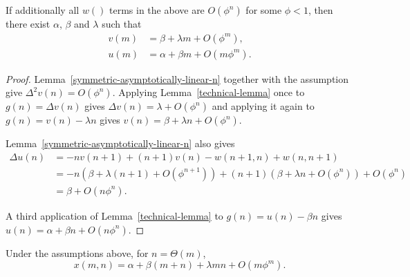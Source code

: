 \documentclass{article}
\begin{document}
\begin{lemma}
  \label{asymptotically-linear-m}
  If additionally all $w()$ terms in the above are $O(\phi^n)$
  for some $\phi < 1$, then there exist 
  $\alpha$, $\beta$ and $\lambda$ such that
  \[
  \begin{split}
    v(m) &= \beta + \lambda m + O(\phi^m), \\
    u(m) &= \alpha + \beta m + O(m \phi^m).
  \end{split}
  \]
\end{lemma}

\begin{proof}
  Lemma~\ref{symmetric-asymptotically-linear-n} together with
  the assumption give $\Delta^2 v(n) = O(\phi^n)$.
  Applying Lemma~\ref{technical-lemma} once to $g(n)=\Delta v(n)$ gives
  $\Delta v(n) = \lambda + O(\phi^n)$ and applying it again to
  $g(n)=v(n)-\lambda n$ gives $v(n)=\beta+\lambda n+O(\phi^n)$.
  
  Lemma~\ref{symmetric-asymptotically-linear-n} also gives
  \[
  \begin{split}
    \Delta u(n) &= -n v(n+1) + (n+1) v(n) - w(n+1,n) + w(n,n+1) \\
    &= -n (\beta + \lambda (n+1) + O(\phi^{n+1}))
        + (n+1)(\beta + \lambda n + O(\phi^n)) + O(\phi^n) \\
    &= \beta + O(n \phi^n).
  \end{split}
  \]
  
  A third application of Lemma~\ref{technical-lemma} to
  $g(n)=u(n)-\beta n$ gives $u(n) = \alpha + \beta n + O(n \phi^n)$.
\end{proof}

\begin{coro}
  \label{asymptotically-bilinear}
  Under the assumptions above, for $n=\Theta(m)$,
  \[ x(m,n) = \alpha + \beta(m + n) + \lambda mn + O(m\phi^m). \]
\end{coro}


%
\end{document}

